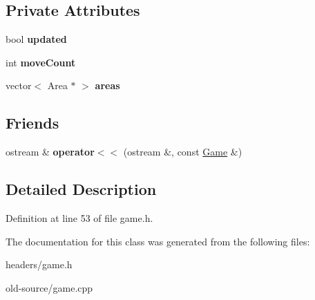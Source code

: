 \subsection*{Private Attributes}
\begin{DoxyCompactItemize}
\item 
\hypertarget{classGame_ad03a503539b01315b3fd020e148ff480}{bool {\bfseries updated}}\label{classGame_ad03a503539b01315b3fd020e148ff480}

\item 
\hypertarget{classGame_a3de2efa2690b73e5565fcd3f17ccbebc}{int {\bfseries move\+Count}}\label{classGame_a3de2efa2690b73e5565fcd3f17ccbebc}

\item 
\hypertarget{classGame_a75c85a025952d38a27db2b0b84206328}{vector$<$ Area $\ast$ $>$ {\bfseries areas}}\label{classGame_a75c85a025952d38a27db2b0b84206328}

\end{DoxyCompactItemize}
\subsection*{Friends}
\begin{DoxyCompactItemize}
\item 
\hypertarget{classGame_a7bb9176e07b6f6c73c930dba6400265f}{ostream \& {\bfseries operator$<$$<$} (ostream \&, const \hyperlink{classGame}{Game} \&)}\label{classGame_a7bb9176e07b6f6c73c930dba6400265f}

\end{DoxyCompactItemize}


\subsection{Detailed Description}


Definition at line 53 of file game.\+h.



The documentation for this class was generated from the following files\+:\begin{DoxyCompactItemize}
\item 
headers/game.\+h\item 
old-\/source/game.\+cpp\end{DoxyCompactItemize}
